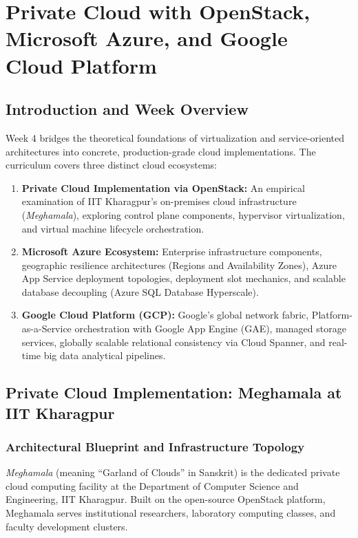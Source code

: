 \documentclass[11pt,a4paper,openany]{report}
\begin{document}
\chapter{Private Cloud with OpenStack, Microsoft Azure, and Google Cloud Platform}

\section{Introduction and Week Overview}
Week 4 bridges the theoretical foundations of virtualization and service-oriented architectures into concrete, production-grade cloud implementations. The curriculum covers three distinct cloud ecosystems:
\begin{enumerate}[leftmargin=*]
  \item \textbf{Private Cloud Implementation via OpenStack:} An empirical examination of IIT Kharagpur's on-premises cloud infrastructure (\emph{Meghamala}), exploring control plane components, hypervisor virtualization, and virtual machine lifecycle orchestration.
  \item \textbf{Microsoft Azure Ecosystem:} Enterprise infrastructure components, geographic resilience architectures (Regions and Availability Zones), Azure App Service deployment topologies, deployment slot mechanics, and scalable database decoupling (Azure SQL Database Hyperscale).
  \item \textbf{Google Cloud Platform (GCP):} Google's global network fabric, Platform-as-a-Service orchestration with Google App Engine (GAE), managed storage services, globally scalable relational consistency via Cloud Spanner, and real-time big data analytical pipelines.
\end{enumerate}

\section{Private Cloud Implementation: Meghamala at IIT Kharagpur}
\subsection{Architectural Blueprint and Infrastructure Topology}
\emph{Meghamala} (meaning ``Garland of Clouds'' in Sanskrit) is the dedicated private cloud computing facility at the Department of Computer Science and Engineering, IIT Kharagpur. Built on the open-source OpenStack platform, Meghamala serves institutional researchers, laboratory computing classes, and faculty development clusters.
\end{document}
